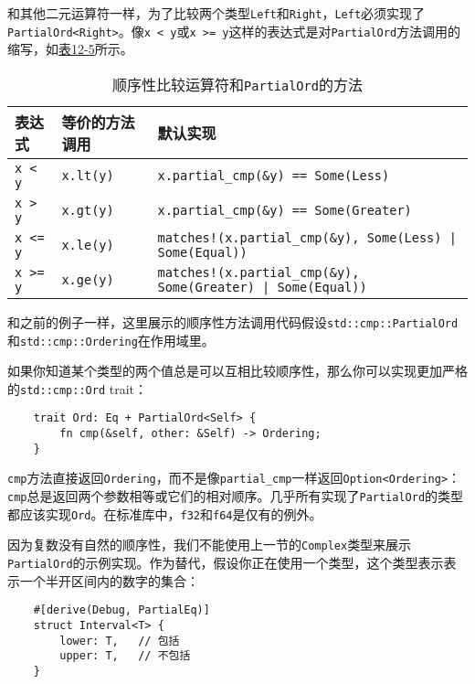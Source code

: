 和其他二元运算符一样，为了比较两个类型\texttt{Left}和\texttt{Right}，\texttt{Left}必须实现了\texttt{PartialOrd<Right>}。像\texttt{x < y}或\texttt{x >= y}这样的表达式是对\texttt{PartialOrd}方法调用的缩写，如\hyperref[t12-5]{表12-5}所示。

\begin{table}[htbp]
    \centering
    \caption{顺序性比较运算符和\texttt{PartialOrd}的方法}
    \label{t12-5}
    \begin{tabular}{lll}
        \hline
        \textbf{表达式} & \textbf{等价的方法调用}   & \textbf{默认实现} \\
        \hline

        \texttt{x < y}  & \texttt{x.lt(y)}  & \texttt{x.partial\_cmp(\&y) == Some(Less)}    \\
        \rowcolor{tablecolor}
        \texttt{x > y}  & \texttt{x.gt(y)}  & \texttt{x.partial\_cmp(\&y) == Some(Greater)} \\
        \texttt{x <= y} & \texttt{x.le(y)}  & \texttt{matches!(x.partial\_cmp(\&y), Some(Less) | Some(Equal))}  \\
        \rowcolor{tablecolor}
        \texttt{x >= y} & \texttt{x.ge(y)}  & \texttt{matches!(x.partial\_cmp(\&y), Some(Greater) | Some(Equal))}   \\
    \end{tabular}
\end{table}

和之前的例子一样，这里展示的顺序性方法调用代码假设\texttt{std::cmp::PartialOrd}和\texttt{std::cmp::Ordering}在作用域里。

如果你知道某个类型的两个值总是可以互相比较顺序性，那么你可以实现更加严格的\texttt{std::cmp::Ord} trait：
\begin{verbatim}
    trait Ord: Eq + PartialOrd<Self> {
        fn cmp(&self, other: &Self) -> Ordering;
    }
\end{verbatim}

\texttt{cmp}方法直接返回\texttt{Ordering}，而不是像\texttt{partial\_cmp}一样返回\texttt{Option<Ordering>}：\texttt{cmp}总是返回两个参数相等或它们的相对顺序。几乎所有实现了\texttt{PartialOrd}的类型都应该实现\texttt{Ord}。在标准库中，\texttt{f32}和\texttt{f64}是仅有的例外。

因为复数没有自然的顺序性，我们不能使用上一节的\texttt{Complex}类型来展示\texttt{PartialOrd}的示例实现。作为替代，假设你正在使用一个类型，这个类型表示表示一个半开区间内的数字的集合：
\begin{verbatim}
    #[derive(Debug, PartialEq)]
    struct Interval<T> {
        lower: T,   // 包括
        upper: T,   // 不包括
    }
\end{verbatim}

